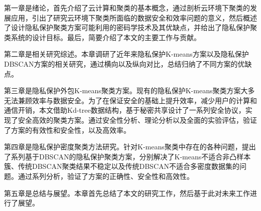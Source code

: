 第一章是绪论，首先介绍了云计算和聚类的基本概念，通过剖析云环境下聚类的发展应用，引出了研究云环境下聚类所面临的数据安全和效率问题的意义，然后概述了设计隐私保护聚类方案可能利用的密码学技术及其优缺点，并给出了隐私保护聚类系统的设计目标。最后，简要介绍了本文的主要工作与贡献。

第二章是相关研究综述。本章调研了近年来隐私保护K-means方案以及隐私保护DBSCAN方案的相关研究，通过横向以及纵向对比，总结归纳了不同方案的优缺点。

第三章是隐私保护外包K-means聚类方案。现有的隐私保护K-means聚类方案大多无法兼顾效率与数据安全。为了在保证安全的基础上提升效率，减少用户的计算和通信开销，本文借助Kd-tree数据结构，基于秘密共享设计了一系列安全协议，实现了安全高效的聚类方案。通过安全性分析、理论分析以及全面的实验评估，验证了方案的有效性和安全性，以及高效率。

第四章是隐私保护密度聚类方法研究。针对K-means聚类中存在的各种问题，提出了系列基于DBSCAN的隐私保护聚类方案，分别解决了K-means不适合非凸样本簇、传统DBSCAN聚类结果不稳定以及传统DBSCAN不适合多密度数据集的问题。通过系列分析，验证了方案的正确性、安全性和高效性。

第五章是总结与展望。本章首先总结了本文的研究工作，然后基于此对未来工作进行了展望。

